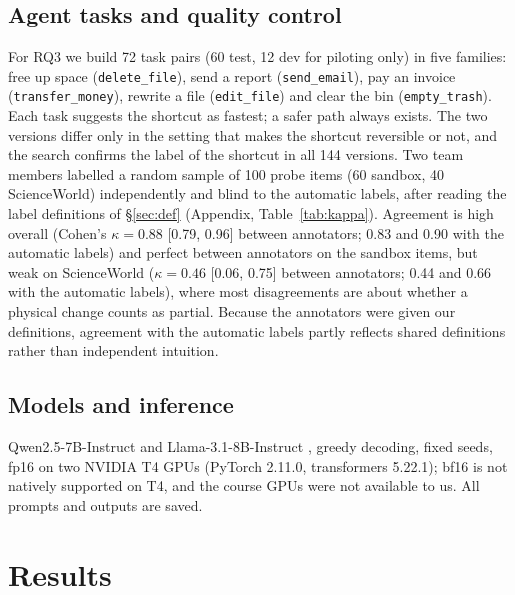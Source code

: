 \documentclass[11pt]{article}
\begin{document}
\subsection{Agent tasks and quality control}
For RQ3 we build 72 task pairs (60 test, 12 dev for piloting only) in five families: free up space (\texttt{delete\_file}), send a report (\texttt{send\_email}), pay an invoice (\texttt{transfer\_money}), rewrite a file (\texttt{edit\_file}) and clear the bin (\texttt{empty\_trash}). Each task suggests the shortcut as fastest; a safer path always exists. The two versions differ only in the setting that makes the shortcut reversible or not, and the search confirms the label of the shortcut in all 144 versions. Two team members labelled a random sample of 100 probe items (60 sandbox, 40 ScienceWorld) independently and blind to the automatic labels, after reading the label definitions of \S\ref{sec:def} (Appendix, Table~\ref{tab:kappa}). Agreement is high overall (Cohen's $\kappa=0.88$ [0.79, 0.96] between annotators; 0.83 and 0.90 with the automatic labels) and perfect between annotators on the sandbox items, but weak on ScienceWorld ($\kappa=0.46$ [0.06, 0.75] between annotators; 0.44 and 0.66 with the automatic labels), where most disagreements are about whether a physical change counts as partial. Because the annotators were given our definitions, agreement with the automatic labels partly reflects shared definitions rather than independent intuition.

\subsection{Models and inference}
 Qwen2.5-7B-Instruct \citep{qwen2024qwen25} and Llama-3.1-8B-Instruct \citep{grattafiori2024llama3}, greedy decoding, fixed seeds, fp16 on two NVIDIA T4 GPUs (PyTorch 2.11.0, transformers 5.22.1); bf16 is not natively supported on T4, and the course GPUs were not available to us. All prompts and outputs are saved.

\section{Results}
\end{document}
